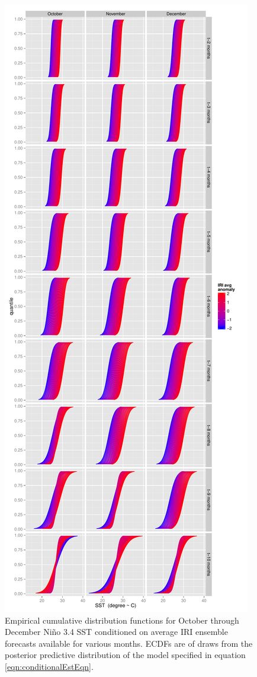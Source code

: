 \documentclass[authoryear]{article}
\begin{document}
\begin{figure}[!htbp]
  \includegraphics[width=\linewidth]{Pricingfigs/conditionalCDFs10to12TraditionalCDFconfig}
  \caption{Empirical cumulative distribution functions for October through December Ni\~no 3.4 SST conditioned on average IRI ensemble forecasts available for various months. ECDFs are of draws from the posterior predictive distribution of the model specified in equation \ref{eqn:conditionalEstEqn}.}
   \label{fig:conditionalCDFs10to12}
\end{figure}
\end{document}
